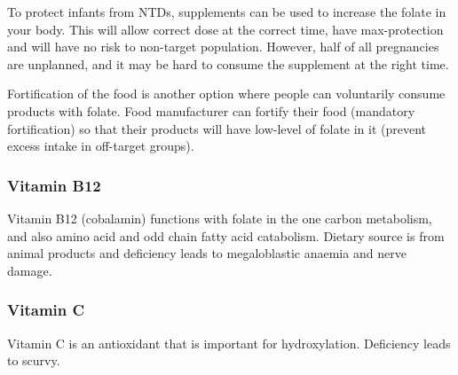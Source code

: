 To protect infants from NTDs, supplements can be used to increase the folate in your body.
This will allow correct dose at the correct time, have max-protection and will have no risk to non-target population.
However, half of all pregnancies are unplanned, and it may be hard to consume the supplement at the right time.

Fortification of the food is another option where people can voluntarily consume products with folate.
Food manufacturer can fortify their food (mandatory fortification) so that their products will have low-level of folate in it (prevent excess intake in off-target groups).

\subsubsection{Vitamin B12}

Vitamin B12 (cobalamin) functions with folate in the one carbon metabolism, and also amino acid and odd chain fatty acid catabolism.
Dietary source is from animal products and deficiency leads to megaloblastic anaemia and nerve damage.

\subsubsection{Vitamin C}

Vitamin C is an antioxidant that is important for hydroxylation.
Deficiency leads to scurvy.

